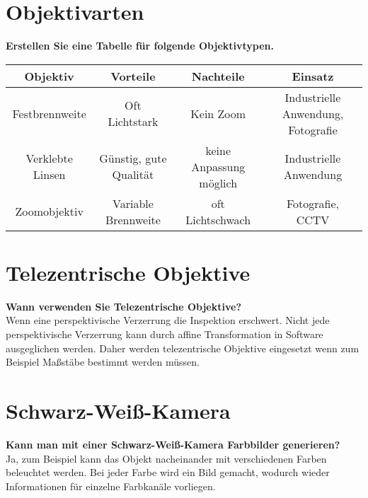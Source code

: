 \documentclass[a4paper]{article}
\begin{document}
	
	\section{Objektivarten}
	\textbf{Erstellen Sie eine Tabelle für folgende Objektivtypen.}\\
		\begin{tabular}{ c|c|c|c }
			Objektiv & Vorteile & Nachteile & Einsatz \\ 
			\hline
			Festbrennweite & Oft Lichtstark & Kein Zoom & Industrielle Anwendung, Fotografie\\
			Verklebte Linsen & Günstig, gute Qualität & keine Anpassung möglich & Industrielle Anwendung\\
			Zoomobjektiv & Variable Brennweite & oft Lichtschwach & Fotografie, CCTV
		\end{tabular}
	
	\section{Telezentrische Objektive}
	\textbf{Wann verwenden Sie Telezentrische Objektive?}\\
	Wenn eine perspektivische Verzerrung die Inspektion erschwert. Nicht jede perspektivische Verzerrung kann durch affine Transformation in Software ausgeglichen werden. Daher werden telezentrische Objektive eingesetzt wenn zum Beispiel Maßstäbe bestimmt werden müssen.\\
	
	\section{Schwarz-Weiß-Kamera}
	\textbf{Kann man mit einer Schwarz-Weiß-Kamera Farbbilder generieren?}\\
	Ja, zum Beispiel kann das Objekt nacheinander mit verschiedenen Farben beleuchtet werden. Bei jeder Farbe wird ein Bild gemacht, wodurch wieder Informationen für einzelne Farbkanäle vorliegen.

	
	
\end{document}
